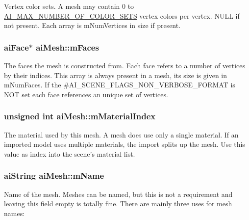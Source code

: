 Vertex color sets. A mesh may contain 0 to \hyperlink{mesh_8h_a74ea1282873ac4b111b48d2380c26bdc}{A\-I\-\_\-\-M\-A\-X\-\_\-\-N\-U\-M\-B\-E\-R\-\_\-\-O\-F\-\_\-\-C\-O\-L\-O\-R\-\_\-\-S\-E\-T\-S} vertex colors per vertex. N\-U\-L\-L if not present. Each array is m\-Num\-Vertices in size if present. \hypertarget{structai_mesh_a5a65fbc7fdea7f8d36f39047425ece07}{
\subsubsection[{m\-Faces}]{ {\bf ai\-Face}$\ast$ ai\-Mesh\-::m\-Faces}}\label{structai_mesh_a5a65fbc7fdea7f8d36f39047425ece07}
The faces the mesh is constructed from. Each face refers to a number of vertices by their indices. This array is always present in a mesh, its size is given in m\-Num\-Faces. If the \#\-A\-I\-\_\-\-S\-C\-E\-N\-E\-\_\-\-F\-L\-A\-G\-S\-\_\-\-N\-O\-N\-\_\-\-V\-E\-R\-B\-O\-S\-E\-\_\-\-F\-O\-R\-M\-A\-T is N\-O\-T set each face references an unique set of vertices. \hypertarget{structai_mesh_aa2807c7ba172115203ed16047ad65f9e}{
\subsubsection[{m\-Material\-Index}]{\setlength{\rightskip}{0pt plus 5cm}unsigned {\bf int} ai\-Mesh\-::m\-Material\-Index}}\label{structai_mesh_aa2807c7ba172115203ed16047ad65f9e}
The material used by this mesh. A mesh does use only a single material. If an imported model uses multiple materials, the import splits up the mesh. Use this value as index into the scene's material list. \hypertarget{structai_mesh_a8dd9433e0c5b008e3e5aee6c801d3b74}{
\subsubsection[{m\-Name}]{ {\bf ai\-String} ai\-Mesh\-::m\-Name}}\label{structai_mesh_a8dd9433e0c5b008e3e5aee6c801d3b74}
Name of the mesh. Meshes can be named, but this is not a requirement and leaving this field empty is totally fine. There are mainly three uses for mesh names\-:
